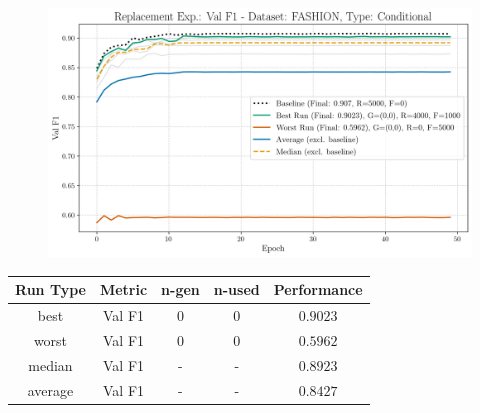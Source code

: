\begin{figure}[htbp]
	\centering
	\includegraphics[width=.85\textwidth]{abb/strat_classifier_performance/FASHION_STRATIFIED_CLASSIFIERS_COND_GAN/replacement_experiments/val_f1_score_['COND']_FASHION_all.png}
	\label{fig:app_strat_class_performance_replacement_exp._val_f1_score_}
\end{figure}
\begin{table}[H]
	\centering
	\vspace{-1em}
	\begin{tabular}{|c|c|c|c|c|}
		\hline
		Run Type & Metric & n-gen & n-used & Performance \\ \hline
		best & Val F1 & 0 & 0 & $0.9023$\\ \hline
		worst & Val F1 & 0 & 0 & $0.5962$\\ \hline
		median & Val F1 & - & - & $0.8923$\\ \hline
		average & Val F1 & - & - & $0.8427$
		\\ \hline
	\end{tabular}
\end{table}
\newpage

